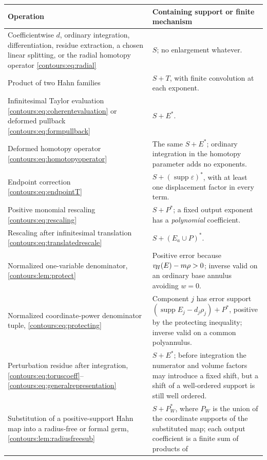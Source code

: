 \documentclass[11pt,letterpaper]{article}
\theoremstyle{definition}
\theoremstyle{remark}
\newcommand{\supp}{\operatorname{supp}}\newcommand{\Res}{\operatorname{Res}}
\numberwithin{equation}{section}
\begin{document}
\begin{center}\small
\begin{longtable}{@{}L{0.46\textwidth}L{0.46\textwidth}@{}}
\toprule
Operation & Containing support or finite mechanism\\\midrule\endhead
Coefficientwise $d$, ordinary integration, differentiation, residue extraction, a
  chosen linear splitting, or the radial homotopy operator
  \eqref{contours:eq:radial} & $S$; no enlargement whatever.\\[0.45em]
Product of two Hahn families & $S+T$, with finite convolution at each
  exponent.\\[0.45em]
Infinitesimal Taylor evaluation \eqref{contours:eq:coherentevaluation} or deformed
  pullback \eqref{contours:eq:formpullback} & $S+E^*$.\\[0.45em]
Deformed homotopy operator \eqref{contours:eq:homotopyoperator}
  & The same $S+E^*$; ordinary integration in the homotopy parameter adds no
    exponents.\\[0.45em]
Endpoint correction \eqref{contours:eq:endpointT}
  & $S+(\supp\varepsilon)^*$, with at least one displacement factor in every
    term.\\[0.45em]
Positive monomial rescaling \eqref{contours:eq:rescaling}
  & $S+P^*$; a fixed output exponent has a \emph{polynomial} coefficient.\\[0.45em]
Rescaling after infinitesimal translation \eqref{contours:eq:translatedrescale}
  & $S+(E_a\cup P)^*$.\\[0.45em]
Normalized one-variable denominator, \cref{contours:lem:protect}
  & Positive error because $v_{\!H}(E)-m\rho>0$; inverse valid on an ordinary base
    annulus avoiding $w=0$.\\[0.45em]
Normalized coordinate-power denominator tuple, \eqref{contours:eq:protecting}
  & Component $j$ has error support $(\supp E_j-d_j\rho_j)+P^*$, positive by the
    protecting inequality; inverse valid on a common polyannulus.\\[0.45em]
Perturbation residue after integration,
  \eqref{contours:eq:toruscoeff}--\eqref{contours:eq:generalrepresentation}
  & $S+E^*$; before integration the numerator and volume factors may introduce a
    fixed shift, but a shift of a well-ordered support is still well
    ordered.\\[0.45em]
Substitution of a positive-support Hahn map into a radius-free or formal germ,
  \cref{contours:lem:radiusfreesub}
  & $S+P_W^*$, where $P_W$ is the union of the coordinate supports of the
    substituted map; each output coefficient is a finite sum of products of

\end{longtable}
\end{center}
\end{document}
